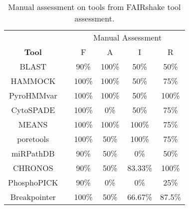 \documentclass{cisfyp}
\begin{document}
\begin{table}[h]
{\renewcommand{\arraystretch}{1.5}%
\begin{tabular}{|c|l|c|c|c|c|}
\cline{1-1} \cline{3-6}
\textbf{} &  & \multicolumn{4}{c|}{Manual Assessment} \\
\textbf{Tool} &  & F & A & I & R \\ \cline{1-1} \cline{3-6} 
BLAST &  & 90\% & 100\% & 50\% & 50\% \\ \cline{1-1} \cline{3-6} 
HAMMOCK &  & 100\% & 100\% & 50\% & 75\% \\ \cline{1-1} \cline{3-6} 
PyroHMMvar &  & 100\% & 100\% & 50\% & 100\% \\ \cline{1-1} \cline{3-6} 
CytoSPADE &  & 100\% & 0\% & 50\% & 75\% \\ \cline{1-1} \cline{3-6} 
MEANS &  & 100\% & 100\% & 100\% & 75\% \\ \cline{1-1} \cline{3-6} 
poretools &  & 100\% & 50\% & 100\% & 75\% \\ \cline{1-1} \cline{3-6} 
miRPathDB &  & 90\% & 50\% & 0\% & 50\% \\ \cline{1-1} \cline{3-6} 
CHRONOS &  & 90\% & 50\% & 83.33\% & 100\% \\ \cline{1-1} \cline{3-6} 
PhosphoPICK &  & 90\% & 0\% & 0\% & 25\% \\ \cline{1-1} \cline{3-6} 
Breakpointer &  & 100\% & 50\% & 66.67\% & 87.5\% \\ \cline{1-1} \cline{3-6} 
\end{tabular}
}
\caption{Manual assessment on tools from FAIRshake tool assessment.}
\label{tab:my-table}
\end{table}
\end{document}
